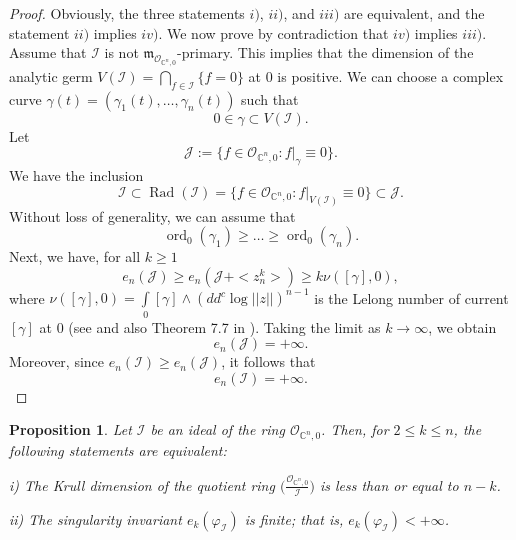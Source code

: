 \documentclass[a4paper,oneside,reqno,11pt]{article}
\newtheorem{proposition}[theorem]{Proposition}
\begin{document}
\begin{proof}
Obviously, the three statements $ i) $, $ ii) $, and $ iii) $ are equivalent, and the statement $ ii) $ implies $ iv) $. We now prove by contradiction that $ iv) $ implies $ iii) $. Assume that $ \mathcal{I} $ is not $\mathfrak{m}_{ \mathcal O_{ \mathbb C^n, 0} }$-primary. This implies that the dimension of the analytic germ $V(\mathcal{I})=\bigcap\limits_{ f\in\mathcal{I} } \{f = 0\}$ at $0$ is positive. We can choose a complex curve $ \gamma(t) = (\gamma_1(t), \dots, \gamma_n(t)) $ such that
$$0 \in \gamma \subset V(\mathcal{I}).$$
Let
$$\mathcal J := \{ f \in {\mathcal{O}}_{\mathbb{C}^n, 0} : f|_{\gamma} \equiv 0 \}.$$
We have the inclusion
$$\mathcal{I} \subset \operatorname{Rad}(\mathcal{I}) = \{f\in{\mathcal{O}}_{\mathbb{C}^n, 0}:  f|_{ V (\mathcal {I} ) } \equiv 0\}\subset \mathcal J.$$
Without loss of generality, we can assume that
$$\operatorname{ord}_0(\gamma_1) \geq \dots \geq \operatorname{ord}_0(\gamma_n).$$
Next, we have, for all $k\geq 1$
$$e_n(\mathcal J) \geq e_n \left( \mathcal J + < z_n^k > \right) \geq k  \nu ( [ \gamma ], 0),$$
where $\nu ( [ \gamma ], 0) = \int\limits_{0} [ \gamma ]\wedge (dd^c \log || z ||)^{n-1}$ is the Lelong number of current $[ \gamma ]$ at $0$ (see \cite{Th67} and also Theorem 7.7 in \cite{De12}). Taking the limit as $ k \to \infty $, we obtain
$$e_n(\mathcal J) = +\infty.$$
Moreover, since $ e_n(\mathcal{I}) \geq e_n(\mathcal J) $, it follows that
$$e_n(\mathcal{I}) = +\infty.$$
\end{proof}

\begin{proposition}\label{pro2} 
Let $\mathcal{I}$ be an ideal of the ring ${\mathcal{O}}_{\mathbb{C}^n, 0}$. Then, for $2 \leq k \leq n$, the following statements are equivalent:

i) The Krull dimension of the quotient ring $\big( \frac{{\mathcal{O}}_{\mathbb{C}^n, 0}}{\mathcal{I}} \big)$ is less than or equal to $n - k$.

ii) The singularity invariant $e_k(\varphi_{\mathcal{I}})$ is finite; that is, $e_k(\varphi_{\mathcal{I}}) < +\infty$.

\end{proposition}
\end{document}
